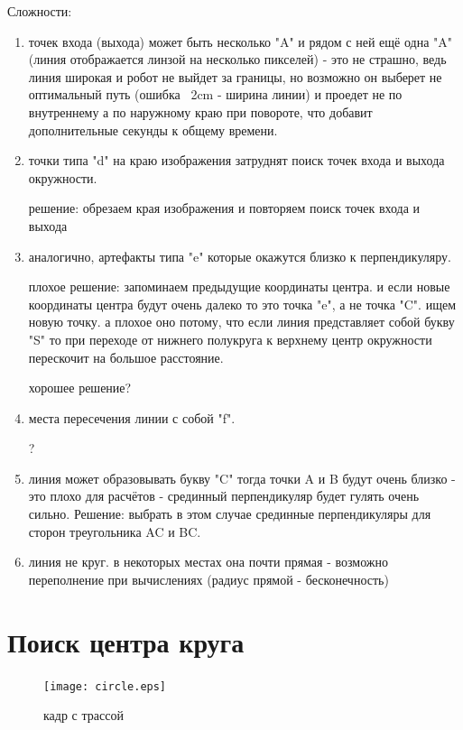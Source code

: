 \documentclass[unicode, 12pt, a4paper,oneside,fleqn]{article}
\begin{document}
  Сложности:
\begin{enumerate}
\item точек входа (выхода) может быть несколько "A" и рядом с ней ещё
  одна "A" (линия отображается линзой на несколько пикселей) - это не
  страшно, ведь линия широкая и робот не выйдет за границы, но
  возможно он выберет не оптимальный путь (ошибка ~2cm - ширина линии)
  и проедет не по внутреннему а по наружному краю при повороте, что
  добавит дополнительные секунды к общему времени.

\item точки типа "d" на краю изображения затруднят поиск точек входа и
  выхода окружности.
  
  решение: обрезаем края изображения и повторяем поиск точек входа и
  выхода

\item аналогично, артефакты типа "e" которые окажутся близко к
  перпендикуляру.
  
  плохое решение: запоминаем предыдущие координаты центра. и если
  новые координаты центра будут очень далеко то это точка "e", а не
  точка "C". ищем новую точку. а плохое оно потому, что если линия
  представляет собой букву "S" то при переходе от нижнего полукруга к
  верхнему центр окружности перескочит на большое расстояние.

  хорошее решение?

\item места пересечения линии с собой "f".

  ?

\item линия может образовывать букву "C" тогда точки A и B будут очень
  близко - это плохо для расчётов - срединный перпендикуляр будет
  гулять очень сильно. Решение: выбрать в этом случае срединные
  перпендикуляры для сторон треугольника AC и BC.

\item линия не круг. в некоторых местах она почти прямая - возможно
  переполнение при вычислениях (радиус прямой - бесконечность)
\end{enumerate}

\section{Поиск центра круга}

\begin{figure}[ht]
\centering %
\texttt{[image: circle.eps]}
\caption{кадр с трассой} \label {fig:search_center:drawings}
\end{figure}
\end{document}
